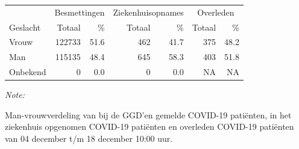 \documentclass[
  english,
  man,floatsintext]{apa6}
\begin{document}
\begin{table}
\centering\begingroup\fontsize{11}{13}\selectfont

\begin{threeparttable}
\begin{tabular}{lrrrrrr}
\toprule
\multicolumn{1}{c}{ } & \multicolumn{2}{c}{Besmettingen} & \multicolumn{2}{c}{Ziekenhuisopnames} & \multicolumn{2}{c}{Overleden} \\
\cmidrule(l{3pt}r{3pt}){2-3} \cmidrule(l{3pt}r{3pt}){4-5} \cmidrule(l{3pt}r{3pt}){6-7}
Geslacht & Totaal & \% & Totaal & \% & Totaal & \%\\
\midrule
Vrouw & 122733 & 51.6 & 462 & 41.7 & 375 & 48.2\\
Man & 115135 & 48.4 & 645 & 58.3 & 403 & 51.8\\
Onbekend & 0 & 0.0 & 0 & 0.0 & NA & NA\\
\bottomrule
\end{tabular}
\begin{tablenotes}
\item \textit{Note: } 
\item Man-vrouwverdeling van bij de GGD’en gemelde COVID-19 patiënten, in het ziekenhuis opgenomen COVID-19 patiënten en overleden COVID-19 patiënten van 04 december t/m 18 december 10:00 uur.
\end{tablenotes}
\end{threeparttable}
\endgroup{}
\end{table}
\newpage
\end{document}
